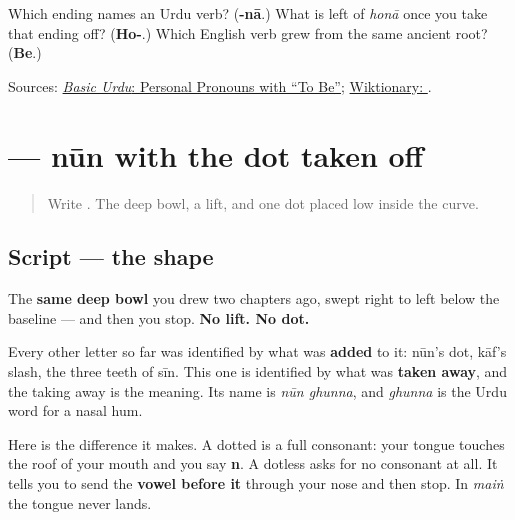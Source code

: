\begin{tcolorbox}[breakable,colback=teal!4,colframe=teal!35!black,title={Before you move on}]
Which ending names an Urdu verb? (\textbf{-nā}.) What is left of \emph{honā} once you take that ending off? (\textbf{Ho-}.) Which English verb grew from the same ancient root? (\textbf{Be}.)

Sources: \href{https://openbooks.lib.msu.edu/urdu/chapter/2-7/}{\emph{Basic Urdu}: Personal Pronouns with “To Be”}; \href{https://en.wiktionary.org/wiki/\%DB\%81\%D9\%88\%D9\%86\%D8\%A7\#Urdu}{Wiktionary: }.
\end{tcolorbox}
\section[\texorpdfstring{\ur{ں} (nūn ghunna)}{ں (nūn ghunna)}]{ — nūn with the dot taken off}

\label{lesson:UR-W06-nun-ghunna}



\begin{quote}
Write . The deep bowl, a lift, and one dot placed low inside the curve.
\end{quote}

\subsection*{Script — the shape}

\begin{quote}
\end{quote}

The \textbf{same deep bowl} you drew two chapters ago, swept right to left below the baseline — and then you stop. \textbf{No lift. No dot.}

Every other letter so far was identified by what was \textbf{added} to it: nūn's dot, kāf's slash, the three teeth of sīn. This one is identified by what was \textbf{taken away}, and the taking away is the meaning. Its name is \textbf{} \emph{nūn ghunna}, and \emph{ghunna} is the Urdu word for a nasal hum.

Here is the difference it makes. A dotted \textbf{} is a full consonant: your tongue touches the roof of your mouth and you say \textbf{n}. A dotless \textbf{} asks for no consonant at all. It tells you to send the \textbf{vowel before it} through your nose and then stop. In \emph{maiṅ} the tongue never lands.

